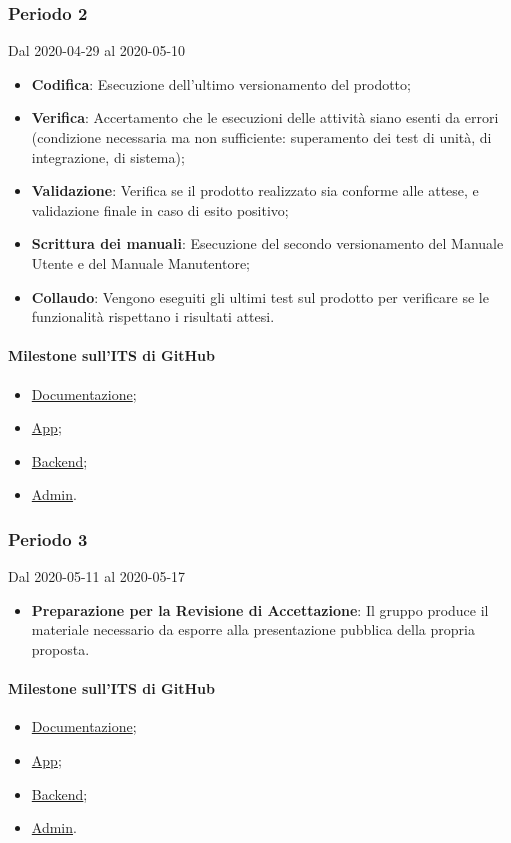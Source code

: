 \subsubsection{Periodo 2} 
Dal 2020-04-29 al 2020-05-10
\begin{itemize}
	\item \textbf{Codifica}: Esecuzione dell'ultimo versionamento del prodotto;
	\item \textbf{Verifica}: Accertamento che le esecuzioni delle attività siano esenti da errori (condizione necessaria ma non sufficiente: superamento dei test di unità, di integrazione, di sistema);
	\item \textbf{Validazione}: Verifica se il prodotto realizzato sia conforme alle attese, e validazione finale in caso di esito positivo;
	\item \textbf{Scrittura dei manuali}: Esecuzione del secondo versionamento del Manuale Utente e del Manuale Manutentore;
	\item \textbf{Collaudo}: Vengono eseguiti gli ultimi test sul prodotto per verificare se le funzionalità rispettano i risultati attesi.
\end{itemize}
\paragraph{Milestone sull'ITS di GitHub}
\begin{itemize}
	\item \href{https://github.com/qb-team/Stalker-Documentazione/milestone/16}{Documentazione};
	\item \href{https://github.com/qb-team/Stalker-App/milestone/5}{App};
	\item \href{https://github.com/qb-team/Stalker-Backend/milestone/6}{Backend};
	\item \href{https://github.com/qb-team/Stalker-Admin/milestone/6}{Admin}.
\end{itemize}

\subsubsection{Periodo 3} 
Dal 2020-05-11 al 2020-05-17
\begin{itemize}
	\item \textbf{Preparazione per la Revisione di Accettazione}: Il gruppo produce il materiale necessario da esporre alla presentazione pubblica della propria proposta.
\end{itemize}
\paragraph{Milestone sull'ITS di GitHub}
\begin{itemize}
	\item \href{https://github.com/qb-team/Stalker-Documentazione/milestone/17}{Documentazione};
	\item \href{https://github.com/qb-team/Stalker-App/milestone/6}{App};
	\item \href{https://github.com/qb-team/Stalker-Backend/milestone/7}{Backend};
	\item \href{https://github.com/qb-team/Stalker-Admin/milestone/7}{Admin}.
\end{itemize}

